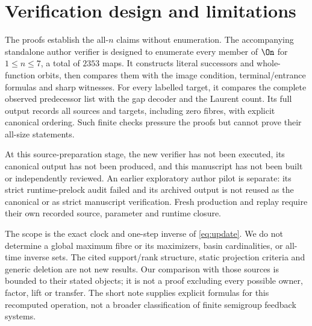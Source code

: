 \section{Verification design and limitations}

The proofs establish the all-$n$ claims without enumeration. The
accompanying standalone author verifier is designed to enumerate every
member of $\On$ for $1\le n\le7$, a total of $2353$ maps. It constructs
literal successors and whole-function orbits, then compares them with
the image condition, terminal/entrance formulas and sharp witnesses.
For every labelled target, it compares the complete observed predecessor
list with the gap decoder and the Laurent count. Its full output records
all sources and targets, including zero fibres, with explicit canonical
ordering. Such finite checks pressure the proofs but cannot prove their
all-size statements.

At this source-preparation stage, the new verifier has not been executed,
its canonical output has not been produced, and this manuscript has not
been built or independently reviewed. An earlier exploratory author
pilot is separate: its strict runtime-prelock audit failed and its
archived output is not reused as the canonical or as strict manuscript
verification. Fresh production and replay require their own recorded
source, parameter and runtime closure.

The scope is the exact clock and one-step inverse of
\eqref{eq:update}. We do not determine a global maximum fibre or its
maximizers, basin cardinalities, or all-time inverse sets. The cited
support/rank structure, static projection criteria and generic deletion
are not new results. Our comparison with those sources is bounded to
their stated objects; it is not a proof excluding every possible owner,
factor, lift or transfer. The short note supplies explicit formulas for
this recomputed operation, not a broader classification of finite
semigroup feedback systems.
